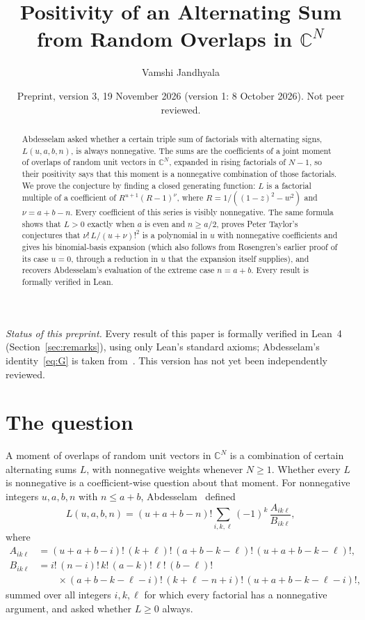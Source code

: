 \documentclass[11pt]{amsart}
\title[Positivity of an Alternating Sum]{Positivity of an Alternating Sum\\ from Random Overlaps in $\mathbb{C}^N$}
\author{Vamshi Jandhyala}
\date{Preprint, version 3, 19 November 2026 (version 1: 8 October 2026). Not peer reviewed.}
\theoremstyle{remark}
\begin{document}
\begin{abstract}
Abdesselam asked whether a certain triple sum of factorials with alternating signs, $L(u,a,b,n)$, is always nonnegative. The sums are the coefficients of a joint moment of overlaps of random unit vectors in $\mathbb{C}^N$, expanded in rising factorials of $N-1$, so their positivity says that this moment is a nonnegative combination of those factorials. We prove the conjecture by finding a closed generating function: $L$ is a factorial multiple of a coefficient of $R^{u+1}(R-1)^{\nu}$, where $R=1/((1-z)^2-w^2)$ and $\nu=a+b-n$. Every coefficient of this series is visibly nonnegative. The same formula shows that $L>0$ exactly when $a$ is even and $n\ge a/2$, proves Peter Taylor's conjectures that $\nu!\,L/(u+\nu)!^2$ is a polynomial in $u$ with nonnegative coefficients and gives his binomial-basis expansion (which also follows from Rosengren's earlier proof of its case $u=0$, through a reduction in $u$ that the expansion itself supplies), and recovers Abdesselam's evaluation of the extreme case $n=a+b$. Every result is formally verified in Lean.
\end{abstract}

\maketitle

\noindent\emph{Status of this preprint.} Every result of this paper is formally verified in Lean~4 (Section~\ref{sec:remarks}), using only Lean's standard axioms; Abdesselam's identity~\eqref{eq:G} is taken from~\cite{MO}. This version has not yet been independently reviewed.

\section{The question}

A moment of overlaps of random unit vectors in $\mathbb{C}^N$ is a combination of certain alternating sums $L$, with nonnegative weights whenever $N\ge1$. Whether every $L$ is nonnegative is a coefficient-wise question about that moment. For nonnegative integers $u,a,b,n$ with $n\le a+b$, Abdesselam~\cite{MO} defined
\begin{equation}\label{eq:L}
L(u,a,b,n)=(u+a+b-n)!\sum_{i,k,\ell}(-1)^k\,\frac{A_{ik\ell}}{B_{ik\ell}},
\end{equation}
where
\begin{align*}
A_{ik\ell}&=(u+a+b-i)!\,(k+\ell)!\,(a+b-k-\ell)!\,(u+a+b-k-\ell)!,\\
B_{ik\ell}&=i!\,(n-i)!\,k!\,(a-k)!\,\ell!\,(b-\ell)!\\
&\qquad\times(a+b-k-\ell-i)!\,(k+\ell-n+i)!\,(u+a+b-k-\ell-i)!,
\end{align*}
summed over all integers $i,k,\ell$ for which every factorial has a nonnegative argument, and asked whether $L\ge0$ always.
\end{document}
